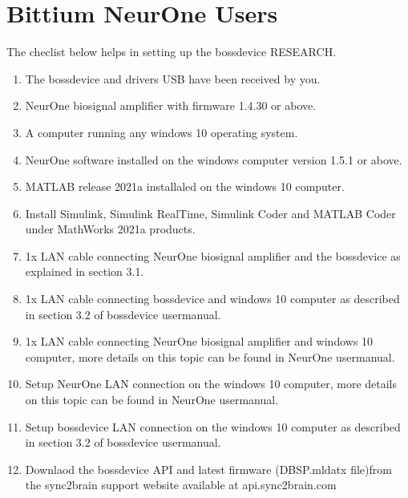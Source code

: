 \documentclass[letterpaper,10pt,english]{sphinxmanual}
\begin{document}
\section{Bittium NeurOne Users}
\label{\detokenize{1b_GettingStartedCheckList:bittium-neurone-users}}
\sphinxAtStartPar
The checlist below helps in setting up the bossdevice RESEARCH.
\begin{enumerate}
%
\item {} 
\sphinxAtStartPar
The bossdevice and drivers USB have been received by you.

\item {} 
\sphinxAtStartPar
NeurOne biosignal amplifier with firmware 1.4.30 or above.

\item {} 
\sphinxAtStartPar
A computer running any windows 10 operating system.

\item {} 
\sphinxAtStartPar
NeurOne software installed on the windows computer version 1.5.1 or above.

\item {} 
\sphinxAtStartPar
MATLAB release 2021a installaled on the windows 10 computer.

\item {} 
\sphinxAtStartPar
Install Simulink, Simulink Real\sphinxhyphen{}Time, Simulink Coder and MATLAB Coder under MathWorks 2021a products.

\item {} 
\sphinxAtStartPar
1x LAN cable connecting NeurOne biosignal amplifier and the bossdevice as explained in section 3.1.

\item {} 
\sphinxAtStartPar
1x LAN cable connecting bossdevice and windows 10 computer as described in section 3.2 of bossdevice usermanual.

\item {} 
\sphinxAtStartPar
1x LAN cable connecting NeurOne biosignal amplifier and windows 10 computer, more details on this topic can be found in NeurOne usermanual.

\item {} 
\sphinxAtStartPar
Setup NeurOne LAN connection on the windows 10 computer, more details on this topic can be found in NeurOne usermanual.

\item {} 
\sphinxAtStartPar
Setup bossdevice LAN connection on the windows 10 computer as described in section 3.2 of bossdevice usermanual.

\item {} 
\sphinxAtStartPar
Downlaod the bossdevice API and latest firmware (DBSP.mldatx file)from the sync2brain support website available at api.sync2brain.com

\end{enumerate}
\end{document}
